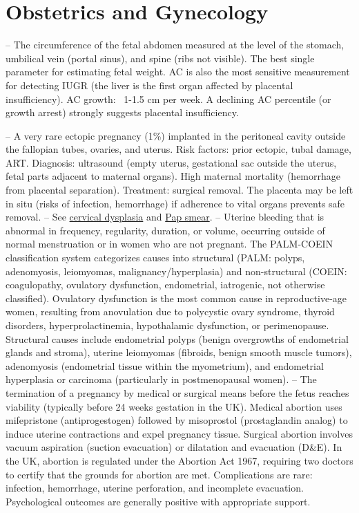 \chapter{Obstetrics and Gynecology}

-- The circumference of the fetal abdomen measured at the level of the stomach, umbilical vein (portal sinus), and spine (ribs not visible). The best single parameter for estimating fetal weight. AC is also the most sensitive measurement for detecting IUGR (the liver is the first organ affected by placental insufficiency). AC growth: ~1-1.5 cm per week. A declining AC percentile (or growth arrest) strongly suggests placental insufficiency.

-- A very rare ectopic pregnancy (1\%) implanted in the peritoneal cavity outside the fallopian tubes, ovaries, and uterus. Risk factors: prior ectopic, tubal damage, ART. Diagnosis: ultrasound (empty uterus, gestational sac outside the uterus, fetal parts adjacent to maternal organs). High maternal mortality (hemorrhage from placental separation). Treatment: surgical removal. The placenta may be left in situ (risks of infection, hemorrhage) if adherence to vital organs prevents safe removal.
-- See \hyperlink{Cervical Dysplasia}{cervical dysplasia} and \hyperlink{Pap Smear}{Pap smear}.
-- Uterine bleeding that is abnormal in frequency, regularity, duration, or volume, occurring outside of normal menstruation or in women who are not pregnant. The PALM-COEIN classification system categorizes causes into structural (PALM: polyps, adenomyosis, leiomyomas, malignancy/hyperplasia) and non-structural (COEIN: coagulopathy, ovulatory dysfunction, endometrial, iatrogenic, not otherwise classified). Ovulatory dysfunction is the most common cause in reproductive-age women, resulting from anovulation due to polycystic ovary syndrome, thyroid disorders, hyperprolactinemia, hypothalamic dysfunction, or perimenopause. Structural causes include endometrial polyps (benign overgrowths of endometrial glands and stroma), uterine leiomyomas (fibroids, benign smooth muscle tumors), adenomyosis (endometrial tissue within the myometrium), and endometrial hyperplasia or carcinoma (particularly in postmenopausal women).
-- The termination of a pregnancy by medical or surgical means before the fetus reaches viability (typically before 24 weeks gestation in the UK). Medical abortion uses mifepristone (antiprogestogen) followed by misoprostol (prostaglandin analog) to induce uterine contractions and expel pregnancy tissue. Surgical abortion involves vacuum aspiration (suction evacuation) or dilatation and evacuation (D\&E). In the UK, abortion is regulated under the Abortion Act 1967, requiring two doctors to certify that the grounds for abortion are met. Complications are rare: infection, hemorrhage, uterine perforation, and incomplete evacuation. Psychological outcomes are generally positive with appropriate support.
